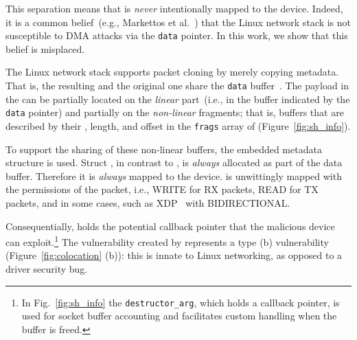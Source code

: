 This separation means that \skb{} is \emph{never} intentionally mapped to the device. Indeed, it is a common belief~(e.g., Markettos et al.~\cite{thunder}) that the Linux network stack is not susceptible to DMA attacks via the \texttt{data} pointer. In this work, we show that this belief is misplaced.

The Linux network stack supports packet cloning by merely copying \skb{} metadata. That is, the resulting \skb{} and the original one share the \texttt{data} buffer~\cite{drivers2005linux}. The payload in the \skb{} can be partially located on the \emph{linear} part~(i.e., in the buffer indicated by the \texttt{data} pointer) and partially on the \emph{non-linear} fragments; that is, buffers that are described by their \page{}, length, and offset in the \texttt{frags} array of \shinfo{} (Figure~\ref{fig:sh_info}). 

To support the sharing of these non-linear buffers, the embedded \shinfo{} metadata structure is used.
Struct \shinfo{}, in contrast to \skb{}, is \emph{always} allocated as part of the data buffer. Therefore it is \emph{always} mapped to the device. \shinfo{} is unwittingly mapped with the permissions of the packet, i.e., WRITE for RX packets, READ for TX packets, and in some cases, such as XDP~\cite{xdp} with BIDIRECTIONAL.

Consequentially, \shinfo{} holds the potential callback pointer that the malicious device can exploit.\footnote{In Fig.~\ref{fig:sh_info} the \texttt{destructor\_arg}, which holds a callback pointer, is used for socket buffer accounting and facilitates custom handling when the buffer is freed.} The \subpage{} vulnerability created by \shinfo{} represents a type (b) vulnerability (Figure~\ref{fig:colocation} (b)): this is innate to Linux networking, as opposed to a driver security bug. 

